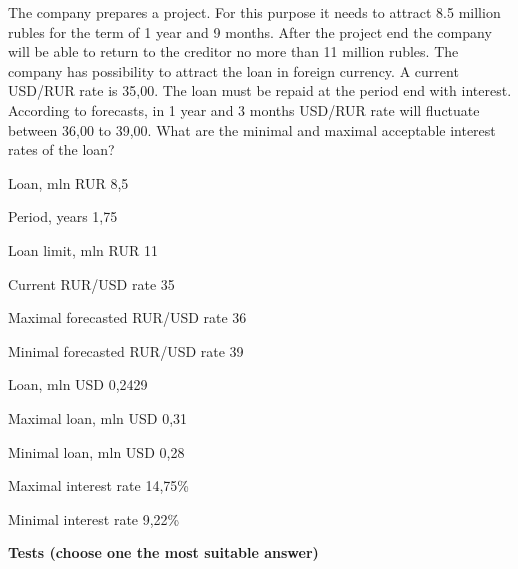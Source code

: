 \documentclass[12pt, table]{exam}
\begin{document}
\begin{questions}
	\question[10] The company prepares a project. For this purpose it needs to attract 8.5 million rubles for the term of 1 year and 9 months. After the project end the company will be able to return to the creditor no more than 11 million rubles. The company has possibility to attract the loan in foreign currency. A current USD/RUR rate is 35,00. The loan must be repaid at the period end with interest. According to forecasts, in 1 year and 3 months USD/RUR rate will fluctuate between 36,00 to 39,00. What are the minimal and maximal acceptable interest rates of the loan?
	
	\begin{solution}[8em]
		
		Loan, mln RUR	8,5
		
		Period, years	1,75
		
		Loan limit, mln RUR	11
		
		Current RUR/USD rate	35
		
		Maximal forecasted RUR/USD rate	36
		
		Minimal forecasted RUR/USD rate	39
		
		Loan, mln USD	0,2429
		
		Maximal loan, mln USD	0,31
		
		Minimal loan, mln USD	0,28
		
		Maximal interest rate	14,75\%
		
		Minimal interest rate	9,22\%		
		
	\end{solution}
\end{questions}
\pagebreak
\noindent\textbf{Tests (choose one the most suitable answer)}
\end{document}
